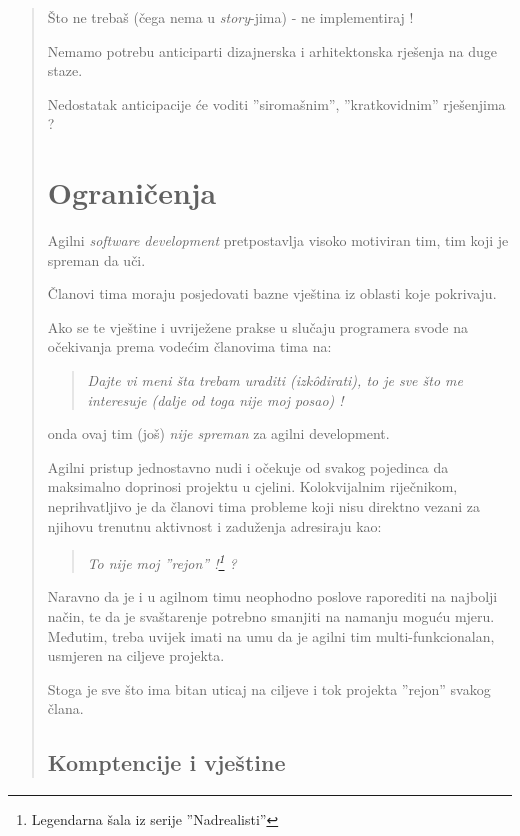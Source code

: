 \documentclass[lmodern, utf8, zavrsni]{fit}
\begin{document}
\begin{quote}
Što ne trebaš (čega nema u \emph{story}-jima) - ne implementiraj !

Nemamo potrebu anticiparti dizajnerska i arhitektonska rješenja na duge staze.

Nedostatak anticipacije će voditi ''siromašnim'', ''kratkovidnim'' rješenjima ?

{\color{red}{::ODGOVORITI, ELABORIRRATI::}}


\chapter{Ograničenja}

Agilni \emph{software development} pretpostavlja visoko motiviran tim, tim koji je spreman da uči. 

Članovi tima moraju posjedovati bazne vještina iz oblasti koje pokrivaju.

Ako se te vještine i uvriježene prakse u slučaju programera svode na očekivanja prema vodećim članovima tima na:

\begin{quotation}
  \emph{Dajte vi meni šta trebam uraditi (izk\^odirati), to je sve što me interesuje (dalje od toga nije moj posao) !}
\end{quotation}

onda ovaj tim (još) \emph{nije spreman} za agilni development.

Agilni pristup jednostavno nudi i očekuje od svakog pojedinca da maksimalno doprinosi projektu u cjelini. Kolokvijalnim riječnikom, neprihvatljivo je da članovi tima probleme koji nisu direktno vezani za njihovu trenutnu aktivnost i zaduženja adresiraju kao:

\begin{quotation}
  \emph{To nije moj ''rejon'' !\footnote{Legendarna šala iz serije ''Nadrealisti''} ?}
\end{quotation}

Naravno da je i u agilnom timu neophodno poslove raporediti na najbolji način, te da je svaštarenje potrebno smanjiti na namanju moguću mjeru.
Međutim, treba uvijek imati na umu da je agilni tim multi-funkcionalan, usmjeren na ciljeve projekta.

Stoga je sve što ima bitan uticaj na ciljeve i tok projekta ''rejon'' svakog člana.

\section{Komptencije i vještine}


\end{quote}
\end{document}
